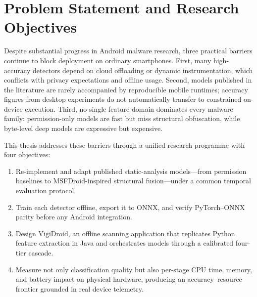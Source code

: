 \section{Problem Statement and Research Objectives}
Despite substantial progress in Android malware research, three practical barriers continue to block deployment on ordinary smartphones. First, many high-accuracy detectors depend on cloud offloading or dynamic instrumentation, which conflicts with privacy expectations and offline usage. Second, models published in the literature are rarely accompanied by reproducible mobile runtimes; accuracy figures from desktop experiments do not automatically transfer to constrained on-device execution. Third, no single feature domain dominates every malware family: permission-only models are fast but miss structural obfuscation, while byte-level deep models are expressive but expensive.

This thesis addresses these barriers through a unified research programme with four objectives:
\begin{enumerate}
 \item Re-implement and adapt published static-analysis models---from permission baselines to MSFDroid-inspired structural fusion---under a common temporal evaluation protocol.
 \item Train each detector offline, export it to ONNX, and verify PyTorch--ONNX parity before any Android integration.
 \item Design VigiDroid, an offline scanning application that replicates Python feature extraction in Java and orchestrates models through a calibrated four-tier cascade.
 \item Measure not only classification quality but also per-stage CPU time, memory, and battery impact on physical hardware, producing an accuracy--resource frontier grounded in real device telemetry.
\end{enumerate}

